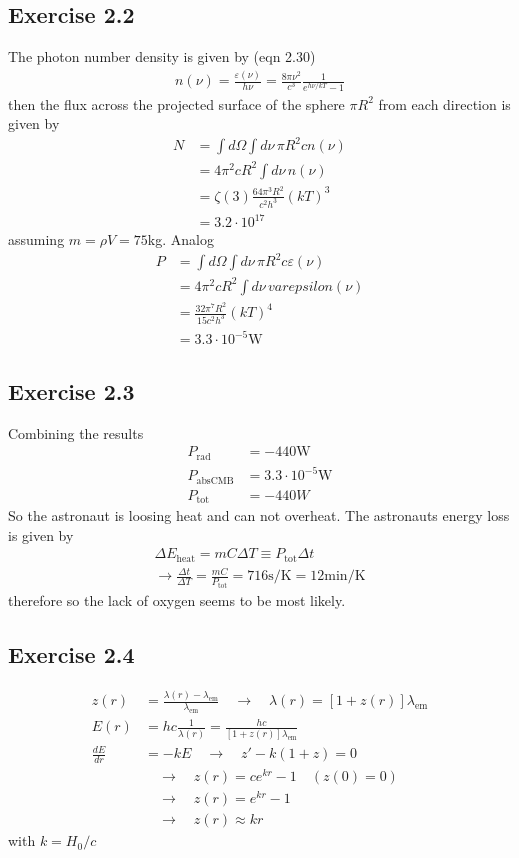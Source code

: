 \documentclass[10pt,a4paper]{book}
\theoremstyle{definition}
\begin{document}
\subsection{Exercise 2.2}
The photon number density is given by (eqn 2.30)
\begin{align}
n(\nu)=\frac{\varepsilon(\nu)}{h\nu}=\frac{8\pi\nu^2}{c^3}\frac{1}{e^{h\nu/kT}-1}
\end{align}
then the flux across the projected surface of the sphere $\pi R^2$ from each direction is given by  
\begin{align}
N&=\int d\Omega\int d\nu\,\pi R^2 cn(\nu)\\
&=4\pi^2 cR^2\int d\nu\, n(\nu)\\
&=\zeta(3)\frac{64\pi^3R^2}{c^2h^3}(kT)^3\\
&=3.2\cdot10^{17}
\end{align}
assuming $m=\rho V=75$kg. Analog
\begin{align}
P&=\int d\Omega\int d\nu\,\pi R^2 c\varepsilon(\nu)\\
&=4\pi^2 cR^2\int d\nu\, varepsilon(\nu)\\
&=\frac{32\pi^7R^2}{15c^2h^3}(kT)^4\\
&=3.3\cdot10^{-5}\text{W}
\end{align}

\subsection{Exercise 2.3}
Combining the results
\begin{align}
P_\text{rad}&=-440\text{W}\\
P_\text{absCMB}&=3.3\cdot10^{-5}\text{W}\\
P_\text{tot}&=-440W
\end{align}
So the astronaut is loosing heat and can not overheat.
The astronauts energy loss is given by
\begin{align}
\Delta E_\text{heat}=mC\Delta T\equiv P_\text{tot}\Delta t\\
\rightarrow \frac{\Delta t}{\Delta T}=\frac{mC}{P_\text{tot}}=716\text{s/K}=12\text{min/K}
\end{align}
therefore so the lack of oxygen seems to be most likely.

\subsection{Exercise 2.4}
\begin{align}
z(r)&=\frac{\lambda(r)-\lambda_\text{em}}{\lambda_\text{em}}\quad\rightarrow\quad\lambda(r)=[1+z(r)]\lambda_\text{em}\\
E(r)&=hc\frac{1}{\lambda(r)}=\frac{hc}{[1+z(r)]\lambda_\text{em}}\\
\frac{dE}{dr}&=-kE\quad\rightarrow\quad z'-k(1+z)=0\\
&\quad\rightarrow\quad z(r)=ce^{kr}-1 \quad(z(0)=0) \\
&\quad\rightarrow\quad z(r)=e^{kr}-1\\
&\quad\rightarrow\quad z(r)\approx kr
\end{align}
with $k=H_0/c$
\end{document}
